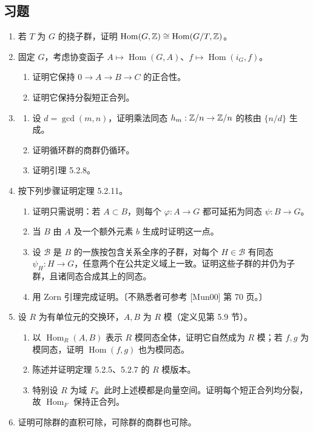 \subsection*{习题}
\begin{enumerate}
\item 若 $T$ 为 $G$ 的挠子群，证明 $\operatorname{Hom}(G,\mathbb{Z})\cong\operatorname{Hom}(G/T,\mathbb{Z})$。
\item 固定 $G$，考虑协变函子 $A\mapsto\operatorname{Hom}(G,A)$、$f\mapsto\operatorname{Hom}(i_G,f)$。
\begin{enumerate}[label=(\alph*)]
\item 证明它保持 $0\to A\to B\to C$ 的正合性。
\item 证明它保持分裂短正合列。
\end{enumerate}
\item \begin{enumerate}[label=(\alph*)]
\item 设 $d=\gcd(m,n)$，证明乘法同态 $h_m:\mathbb{Z}/n\to\mathbb{Z}/n$ 的核由 $\{n/d\}$ 生成。
\item 证明循环群的商群仍循环。
\item 证明引理 5.2.8。
\end{enumerate}
\item 按下列步骤证明定理 5.2.11。
\begin{enumerate}[label=(\alph*)]
\item 证明只需说明：若 $A\subset B$，则每个 $\varphi:A\to G$ 都可延拓为同态 $\psi:B\to G$。
\item 当 $B$ 由 $A$ 及一个额外元素 $b$ 生成时证明这一点。
\item 设 $\mathcal B$ 是 $B$ 的一族按包含关系全序的子群，对每个 $H\in\mathcal B$ 有同态 $\psi_H:H\to G$，任意两个在公共定义域上一致。证明这些子群的并仍为子群，且诸同态合成其上的同态。
\item 用 Zorn 引理完成证明。〔不熟悉者可参考 [Mun00] 第 70 页。〕
\end{enumerate}
\item 设 $R$ 为有单位元的交换环，$A,B$ 为 $R$ 模（定义见第 5.9 节）。
\begin{enumerate}[label=(\alph*)]
\item 以 $\operatorname{Hom}_R(A,B)$ 表示 $R$ 模同态全体，证明它自然成为 $R$ 模；若 $f,g$ 为模同态，证明 $\operatorname{Hom}(f,g)$ 也为模同态。
\item 陈述并证明定理 5.2.5、5.2.7 的 $R$ 模版本。
\item 特别设 $R$ 为域 $F$。此时上述模都是向量空间。证明每个短正合列均分裂，故 $\operatorname{Hom}_F$ 保持正合列。
\end{enumerate}
\item 证明可除群的直积可除，可除群的商群也可除。
\end{enumerate}
